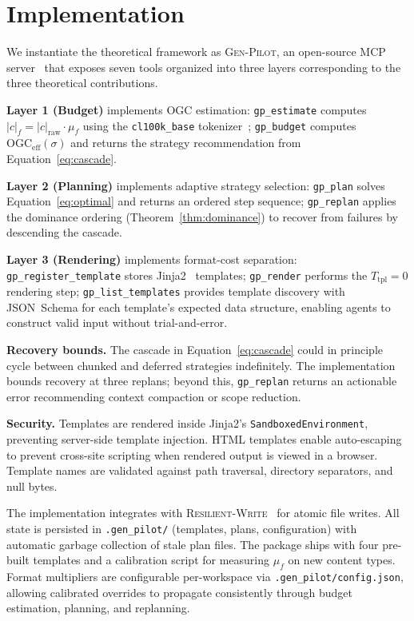 \documentclass[11pt,twocolumn]{article}
\newcommand{\tool}[1]{\texttt{#1}}
\newcommand{\genpilot}{\textsc{Gen-Pilot}}
\newcommand{\rw}{\textsc{Resilient-Write}}
\newcommand{\ogceff}{\mathrm{OGC}_{\mathrm{eff}}}
\begin{document}
\section{Implementation}
\label{sec:impl}

We instantiate the theoretical framework as \genpilot{}, an
open-source MCP server~\cite{mcp2024} that exposes seven tools
organized into three layers corresponding to the three
theoretical contributions.

\textbf{Layer 1 (Budget)} implements OGC estimation:
\tool{gp\_estimate} computes $|c|_f = |c|_{\text{raw}} \cdot \mu_f$
using the \texttt{cl100k\_base} tokenizer~\cite{tiktoken2023,sennrich2016bpe};
\tool{gp\_budget} computes $\ogceff(\sigma)$ and returns the
strategy recommendation from Equation~\ref{eq:cascade}.

\textbf{Layer 2 (Planning)} implements adaptive strategy selection:
\tool{gp\_plan} solves Equation~\ref{eq:optimal} and returns an
ordered step sequence;
\tool{gp\_replan} applies the dominance ordering
(Theorem~\ref{thm:dominance}) to recover from failures by
descending the cascade.

\textbf{Layer 3 (Rendering)} implements format-cost separation:
\tool{gp\_register\_template} stores Jinja2~\cite{jinja2} templates;
\tool{gp\_render} performs the $T_{\text{tpl}} = 0$ rendering step;
\tool{gp\_list\_templates} provides template discovery with
JSON~Schema for each template's expected data structure, enabling
agents to construct valid input without trial-and-error.

\textbf{Recovery bounds.}
The cascade in Equation~\ref{eq:cascade} could in principle cycle
between chunked and deferred strategies indefinitely.  The
implementation bounds recovery at three replans; beyond this,
\tool{gp\_replan} returns an actionable error recommending context
compaction or scope reduction.

\textbf{Security.}
Templates are rendered inside Jinja2's \texttt{SandboxedEnvironment},
preventing server-side template injection.  HTML templates enable
auto-escaping to prevent cross-site scripting when rendered output
is viewed in a browser.  Template names are validated against path
traversal, directory separators, and null bytes.

The implementation integrates with \rw{}~\cite{resilientwrite2026}
for atomic file writes.  All state is persisted in
\texttt{.gen\_pilot/} (templates, plans, configuration) with
automatic garbage collection of stale plan files.
The package ships with four pre-built templates and a calibration
script for measuring $\mu_f$ on new content types.
Format multipliers are configurable per-workspace via
\texttt{.gen\_pilot/config.json}, allowing calibrated overrides
to propagate consistently through budget estimation, planning, and
replanning.
\end{document}
